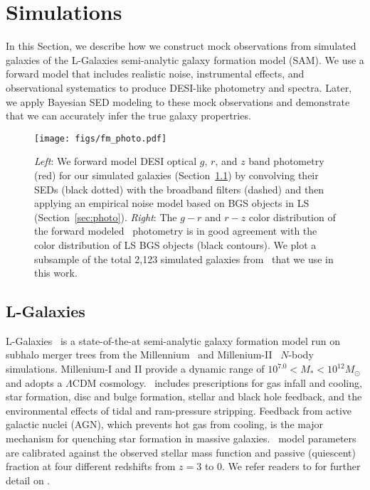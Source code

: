 \section{Simulations}\label{sec:sims}
In this Section, we describe how we construct mock observations from simulated
galaxies of the {\sc L-Galaxies} semi-analytic galaxy formation model (SAM).
We use a forward model that includes realistic noise, instrumental effects, and
observational systematics to produce DESI-like photometry and spectra. 
Later, we apply Bayesian SED modeling to these mock observations and
demonstrate that we can accurately infer the true galaxy propertries.

\begin{figure}
\begin{center}
\texttt{[image: figs/fm\_photo.pdf]}
\caption{{\em Left}: We forward model DESI optical $g$, $r$, and $z$ band
    photometry (red) for our simulated galaxies (Section~\ref{sec:lgal}) by
    convolving their SEDs (black dotted) with the broadband filters (dashed)
    and then applying an empirical noise model based on BGS objects in LS
    (Section~\ref{sec:photo}).
    {\em Right}: The $g-r$ and $r-z$ color distribution of the forward modeled
    \lgal~photometry is in good agreement with the color distribution of LS BGS
    objects (black contours). 
    We plot a subsample of the total 2,123 simulated galaxies from
    \lgal~that we use in this work.
    } \label{fig:photo}
\end{center}
\end{figure}

\subsection{L-Galaxies} \label{sec:lgal}
{\sc L-Galaxies}~\citep[hereafter \lgal;][]{henriques2015} is a state-of-the-at
semi-analytic galaxy formation model run on subhalo merger trees from the
Millennium~\citep{springel2005a} and Millenium-II~\citep{boylan-kolchin2009}
$N$-body simulations. 
Millenium-I and II provide a dynamic range of $10^{7.0} < M_* < 10^{12}
M_\odot$ and adopts a \cite{planckcollaboration2014a} $\Lambda$CDM cosmology.
\lgal~includes prescriptions for gas infall and cooling, star formation, disc
and bulge formation, stellar and black hole feedback, and the environmental
effects of tidal and ram-pressure stripping.
Feedback from active galactic nuclei (AGN), which prevents hot gas from
cooling, is the major mechanism for quenching star formation in massive
galaxies.
\lgal~model parameters are calibrated against the observed stellar mass
function and passive (quiescent) fraction at four different
redshifts from $z = 3$ to 0.
We refer readers to \cite{henriques2015} for further detail on \lgal.

